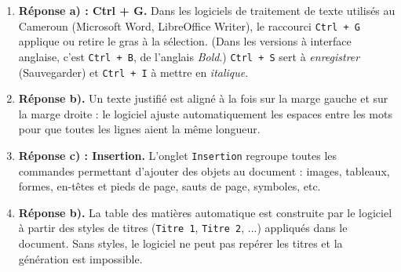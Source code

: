 \documentclass[11pt]{article}
\newcommand{\cle}[1]{{\popxbold\color{popdark}#1}}
\begin{document}
\begin{corrige}
\begin{enumerate}
\item \textbf{Réponse a) : Ctrl + G.} Dans les logiciels de traitement de texte utilisés au Cameroun (Microsoft Word, LibreOffice Writer), le raccourci \texttt{Ctrl + G} applique ou retire le \cle{gras} à la sélection. (Dans les versions à interface anglaise, c'est \texttt{Ctrl + B}, de l'anglais \emph{Bold}.) \texttt{Ctrl + S} sert à \emph{enregistrer} (Sauvegarder) et \texttt{Ctrl + I} à mettre en \emph{italique}.
\item \textbf{Réponse b).} Un texte \cle{justifié} est aligné à la fois sur la marge gauche et sur la marge droite : le logiciel ajuste automatiquement les espaces entre les mots pour que toutes les lignes aient la même longueur.
\item \textbf{Réponse c) : Insertion.} L'onglet \texttt{Insertion} regroupe toutes les commandes permettant d'ajouter des objets au document : images, tableaux, formes, en-têtes et pieds de page, sauts de page, symboles, etc.
\item \textbf{Réponse b).} La table des matières automatique est construite par le logiciel à partir des \cle{styles de titres} (\texttt{Titre 1}, \texttt{Titre 2}, ...) appliqués dans le document. Sans styles, le logiciel ne peut pas repérer les titres et la génération est impossible.
\end{enumerate}
\end{corrige}
\end{document}
